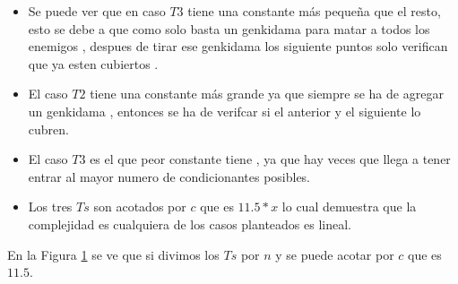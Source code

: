 	     \begin{itemize}
            \item Se puede ver que en caso $T3$ tiene una constante más pequeña que el resto, esto se debe a que como solo basta un genkidama para matar a todos los enemigos , despues de tirar ese genkidama los siguiente puntos solo verifican que ya esten cubiertos .
            \item 	El caso $T2$ tiene una constante más grande ya que siempre se ha de agregar un genkidama , entonces se ha de verifcar si el anterior y el siguiente lo cubren. 
            \item El caso $T3$ es el que peor constante tiene , ya que hay veces que llega a tener entrar al mayor numero de condicionantes posibles. 
            \item Los tres $Ts$ son acotados por $c$ que es $11.5 * x$ lo cual demuestra que la complejidad es cualquiera de los casos planteados es lineal. 
        \end{itemize}


	

	
	\begin{figure}[H]
		\centering
		\caption{}
		\label{fig:exp2:part_tiempo_sobre_n}
	\end{figure}

	En la Figura \ref{fig:exp2:part_tiempo_sobre_n} se ve que si divimos los $Ts$ por $n$ y se puede acotar por $c$ que es $11.5$.


